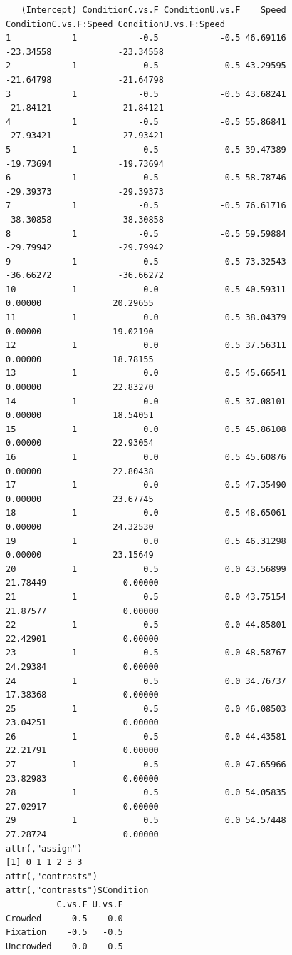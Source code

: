 \documentclass[
]{article}
\begin{document}
\begin{verbatim}
   (Intercept) ConditionC.vs.F ConditionU.vs.F    Speed ConditionC.vs.F:Speed ConditionU.vs.F:Speed
1            1            -0.5            -0.5 46.69116             -23.34558             -23.34558
2            1            -0.5            -0.5 43.29595             -21.64798             -21.64798
3            1            -0.5            -0.5 43.68241             -21.84121             -21.84121
4            1            -0.5            -0.5 55.86841             -27.93421             -27.93421
5            1            -0.5            -0.5 39.47389             -19.73694             -19.73694
6            1            -0.5            -0.5 58.78746             -29.39373             -29.39373
7            1            -0.5            -0.5 76.61716             -38.30858             -38.30858
8            1            -0.5            -0.5 59.59884             -29.79942             -29.79942
9            1            -0.5            -0.5 73.32543             -36.66272             -36.66272
10           1             0.0             0.5 40.59311               0.00000              20.29655
11           1             0.0             0.5 38.04379               0.00000              19.02190
12           1             0.0             0.5 37.56311               0.00000              18.78155
13           1             0.0             0.5 45.66541               0.00000              22.83270
14           1             0.0             0.5 37.08101               0.00000              18.54051
15           1             0.0             0.5 45.86108               0.00000              22.93054
16           1             0.0             0.5 45.60876               0.00000              22.80438
17           1             0.0             0.5 47.35490               0.00000              23.67745
18           1             0.0             0.5 48.65061               0.00000              24.32530
19           1             0.0             0.5 46.31298               0.00000              23.15649
20           1             0.5             0.0 43.56899              21.78449               0.00000
21           1             0.5             0.0 43.75154              21.87577               0.00000
22           1             0.5             0.0 44.85801              22.42901               0.00000
23           1             0.5             0.0 48.58767              24.29384               0.00000
24           1             0.5             0.0 34.76737              17.38368               0.00000
25           1             0.5             0.0 46.08503              23.04251               0.00000
26           1             0.5             0.0 44.43581              22.21791               0.00000
27           1             0.5             0.0 47.65966              23.82983               0.00000
28           1             0.5             0.0 54.05835              27.02917               0.00000
29           1             0.5             0.0 54.57448              27.28724               0.00000
attr(,"assign")
[1] 0 1 1 2 3 3
attr(,"contrasts")
attr(,"contrasts")$Condition
          C.vs.F U.vs.F
Crowded      0.5    0.0
Fixation    -0.5   -0.5
Uncrowded    0.0    0.5
\end{verbatim}
\end{document}
